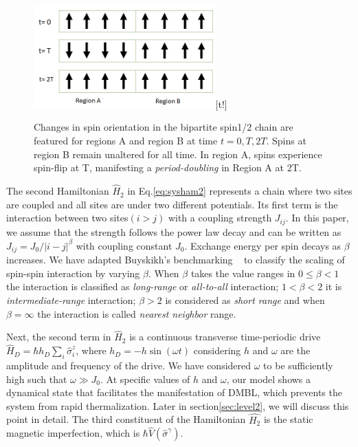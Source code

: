 \documentclass[%
reprint,
superscriptaddress,
amsmath,amssymb,showkeys,
aps,
prb,
]{revtex4-2}
\begin{document}
	\begin{figure}
		\centering
		\includegraphics[width=7.0cm]{pic_regions.jpg}[t!]
		\caption{Changes in spin orientation in the bipartite spin1/2 chain are featured for regions A and region B at time $t= 0, T, 2T$. Spins at region B remain unaltered for all time. In region A, spins experience spin-flip at T, manifesting a \textit{period-doubling} in Region A at 2T.}
		\label{Fig:spinflip}
	\end{figure}
	
	The second Hamiltonian $\hat{H}_2$ in Eq.\eqref{eq:sysham2} represents a chain where two sites are coupled and all sites are under two different potentials. Its first term is the interaction between two sites$(i>j)$ with a coupling strength $J_{ij}$. In this paper, we assume that the strength follows the power law decay and can be written as $J_{ij}={J_0}/{|i-j|^\beta}$ with coupling constant $J_0$.
	Exchange energy per spin decays as $\beta$ increases. We have adapted Buyskikh's benchmarking ~\cite{buyskikh_entanglement_2016} to classify the scaling of spin-spin interaction by varying $\beta$. When $\beta$ takes the value ranges in  $0 \leq \beta <1$ the interaction is classified as \textit{long-range} or \textit{all-to-all} interaction; $1<\beta<2$ it is \textit{intermediate-range} interaction; $\beta > 2$ is considered as \textit{short range} and when $\beta= \infty$ the interaction is called \textit{nearest neighbor} range.
	
	
	Next, the second term in $\hat{H}_2$ is a continuous transverse time-periodic drive $\displaystyle \hat{H}_D=\hbar h_D \sum_i\hat{\sigma}^z_i$, where $\displaystyle h_D = -h\sin{(\omega t)}$ considering $h$ and $\omega$ are the amplitude and frequency of the drive. We have considered $\omega$ to be sufficiently high such that $\omega\gg J_0$. At specific values of $h$ and $\omega$, our model shows a dynamical state that facilitates the manifestation of DMBL, which prevents the system from rapid thermalization. Later in section\ref{sec:level2}, we will discuss this point in detail. 
	The third constituent of the Hamiltonian $\hat{H_2}$ is the static magnetic imperfection, which is $\displaystyle{\hbar\hat{V}(\hat{\sigma}^{\gamma})}$. 
	
\end{document}
